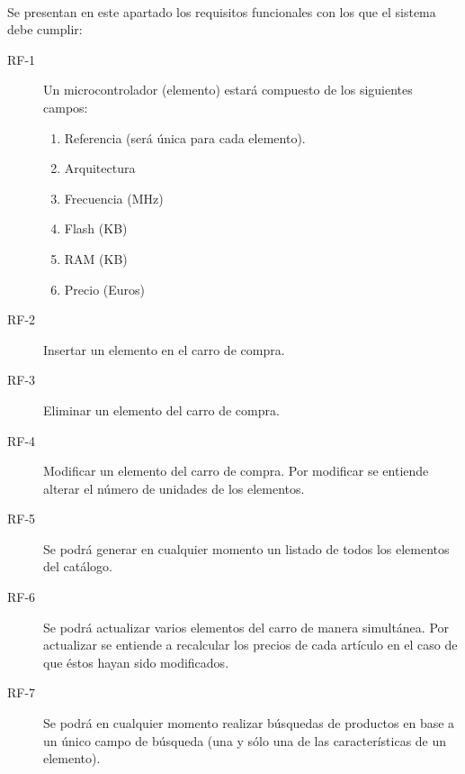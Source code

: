 \paragraph{}Se presentan en este apartado los requisitos funcionales con los que el sistema debe cumplir:


\begin{description}
\item[RF-1] Un microcontrolador (elemento) estará compuesto de los siguientes campos: 
	\begin{enumerate}
		\item Referencia (será única para cada elemento).
        \item Arquitectura
        \item Frecuencia (MHz)
        \item Flash (KB)
        \item RAM (KB)
        \item Precio (Euros)
	\end{enumerate}
	
\item[RF-2] Insertar un elemento en el carro de compra.
   
\item[RF-3] Eliminar un elemento del carro de compra.
	
\item[RF-4] Modificar un elemento del carro de compra. Por modificar se entiende alterar el número de unidades de los elementos.

\item[RF-5] Se podrá generar en cualquier momento un listado de todos los elementos del catálogo.

\item[RF-6] Se podrá actualizar varios elementos del carro de manera simultánea. Por actualizar se entiende a recalcular los precios de cada artículo en el caso de que éstos hayan sido modificados.

\item[RF-7] Se podrá en cualquier momento realizar búsquedas de productos en base a un único campo de búsqueda (una y sólo una de las características de un elemento).
	

\end{description}
